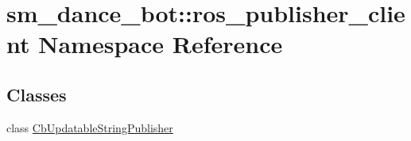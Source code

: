 \hypertarget{namespacesm__dance__bot_1_1ros__publisher__client}{}\section{sm\+\_\+dance\+\_\+bot\+:\+:ros\+\_\+publisher\+\_\+client Namespace Reference}
\label{namespacesm__dance__bot_1_1ros__publisher__client}
\subsection*{Classes}
\begin{DoxyCompactItemize}
\item 
class \hyperlink{classsm__dance__bot_1_1ros__publisher__client_1_1CbUpdatableStringPublisher}{Cb\+Updatable\+String\+Publisher}
\end{DoxyCompactItemize}
